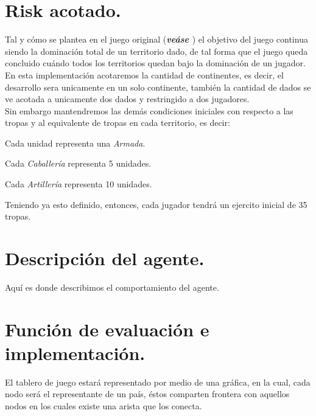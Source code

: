 \documentclass[12pt,twocolumn,draft]{article}
\begin{document}
\section{Risk acotado.}

Tal y c\'omo se plantea en el juego original (\textbf{\textit{ve\'ase \cite{RISK}}}) el objetivo del juego continua siendo la dominaci\'on total de un territorio dado, de tal forma
que el juego queda concluido cu\'ando todos los territorios quedan bajo la dominaci\'on de 
un jugador.\\
En esta implementaci\'on acotaremos la cantidad de continentes, es decir, el desarrollo sera unicamente en un solo continente, tambi\'en la cantidad de dados se ve acotada a unicamente dos dados y restringido a dos jugadores.\\

Sin embargo mantendremos las dem\'as condiciones iniciales con respecto a las tropas y al equivalente de tropas en cada territorio, es decir:
\begin{list}{*}{}
\item Cada unidad representa una \textit{Armada}.
\item Cada \textit{Caballer\'ia} representa 5 unidades.
\item Cada \textit{Artiller\'ia} representa 10 unidades.
\end{list}

Teniendo ya esto definido, entonces, cada jugador tendr\'a un ejercito inicial de 35 tropas.

\section{Descripci\'on del agente.}
Aqu\'i es donde describimos el comportamiento del agente.


\section{Funci\'on de evaluaci\'on e implementaci\'on.}
El tablero de juego estar\'a representado por medio de una gr\'afica, en la cual, cada nodo  ser\'a el representante de un pa\'is, \'estos comparten frontera con aquellos nodos en los cuales existe una arista que los conecta.\\
\end{document}
